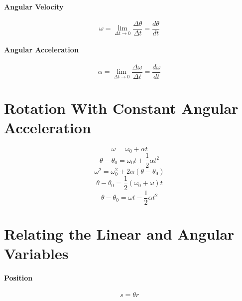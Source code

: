 \documentclass{article}
\begin{document}
        \paragraph{Angular Velocity}
        \begin{equation}
            \omega = \lim_{\Delta t \to 0} \frac{\Delta \theta}{\Delta t} = \frac{d\theta}{dt}
        \end{equation}

        \paragraph{Angular Acceleration}
        \begin{equation}
            \alpha = \lim_{\Delta t \to 0} \frac{\Delta \omega}{\Delta t} = \frac{d\omega}{dt}
        \end{equation}

    \section{Rotation With Constant Angular Acceleration}

        \begin{equation}
            \omega = \omega_0 + \alpha t
        \end{equation}
        \begin{equation}
            \theta - \theta_0 = \omega_0 t + \frac{1}{2} \alpha t^2
        \end{equation}
        \begin{equation}
            \omega^2 = \omega_0^2 + 2 \alpha \left( \theta - \theta_0 \right)
        \end{equation}
        \begin{equation}
            \theta - \theta_0 = \frac{1}{2} \left( \omega_0 + \omega \right) t
        \end{equation}
        \begin{equation}
            \theta - \theta_0 = \omega t - \frac{1}{2} \alpha t^2
        \end{equation}

    \section{Relating the Linear and Angular Variables}

        \paragraph{Position}
        \begin{equation}
            s = \theta r
        \end{equation}
\end{document}
